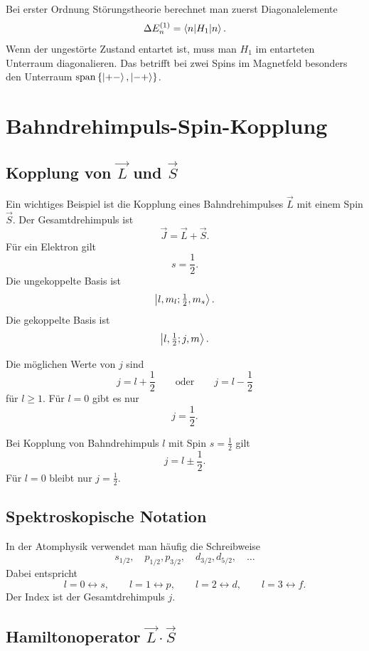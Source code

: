 \begin{examtipbox}
Bei erster Ordnung Störungstheorie berechnet man zuerst Diagonalelemente
\[
    \Delta E_n^{(1)}=\left\langle n\middle|H_1\middle|n\right\rangle.
\]
Wenn der ungestörte Zustand entartet ist, muss man \(H_1\) im entarteten Unterraum diagonalieren. Das betrifft bei zwei Spins im Magnetfeld besonders den Unterraum \(\operatorname{span}\left\{ \left|+-\right\rangle,\left|-+\right\rangle \right\}\).
\end{examtipbox}

\section{Bahndrehimpuls-Spin-Kopplung}

\subsection{Kopplung von \texorpdfstring{\(\vec L\)}{L} und \texorpdfstring{\(\vec S\)}{S}}

Ein wichtiges Beispiel ist die Kopplung eines Bahndrehimpulses \(\vec L\) mit einem Spin \(\vec S\). Der Gesamtdrehimpuls ist
\[
    \vec J=\vec L+\vec S.
\]
Für ein Elektron gilt
\[
    s=\frac12.
\]
Die ungekoppelte Basis ist
\[
    \left|l,m_l;\tfrac12,m_s\right\rangle.
\]
Die gekoppelte Basis ist
\[
    \left|l,\tfrac12;j,m\right\rangle.
\]

Die möglichen Werte von \(j\) sind
\[
    j=l+\frac12
    \qquad \text{oder} \qquad
    j=l-\frac12
\]
für \(l\geq1\). Für \(l=0\) gibt es nur
\[
    j=\frac12.
\]

\begin{formulabox}
Bei Kopplung von Bahndrehimpuls \(l\) mit Spin \(s=\frac12\) gilt
\[
    j=l\pm\frac12.
\]
Für \(l=0\) bleibt nur \(j=\frac12\).
\end{formulabox}

\subsection{Spektroskopische Notation}

In der Atomphysik verwendet man häufig die Schreibweise
\[
    s_{1/2},
    \quad
    p_{1/2},p_{3/2},
    \quad
    d_{3/2},d_{5/2},
    \quad \dots
\]
Dabei entspricht
\[
    l=0 \leftrightarrow s,
    \qquad
    l=1 \leftrightarrow p,
    \qquad
    l=2 \leftrightarrow d,
    \qquad
    l=3 \leftrightarrow f.
\]
Der Index ist der Gesamtdrehimpuls \(j\).

\subsection{Hamiltonoperator \texorpdfstring{\(\vec L\cdot\vec S\)}{L dot S}}

